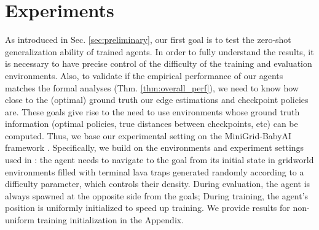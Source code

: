 







\section{Experiments}
As introduced in Sec. \ref{sec:preliminary}, our first goal is to test the zero-shot generalization ability of trained agents. In order to fully understand the results, it is necessary to have precise control of the difficulty of the training and evaluation environments. Also, to validate if the empirical performance of our agents matches the formal analyses (Thm. \ref{thm:overall_perf}), we need to know how close to the (optimal) ground truth our edge estimations and checkpoint policies are. These goals give rise to the need to use environments whose ground truth information (optimal policies, true distances between checkpoints, etc) can be computed. Thus, we base our experimental setting on the MiniGrid-BabyAI framework \cite{chevalierboisvert2018minigrid,chevalier2018babyai,hui2020babyai}. Specifically, we build on the environments and experiment settings used in \citet{zhao2021consciousness,alver2022understanding}: the agent needs to navigate to the goal from its initial state in gridworld environments filled with terminal lava traps generated randomly according to a difficulty parameter, which  controls their density. During evaluation, the agent is always spawned at the opposite side from the goals; During training, the agent's position is uniformly initialized to speed up training. We provide results for non-uniform training initialization in the Appendix. 

